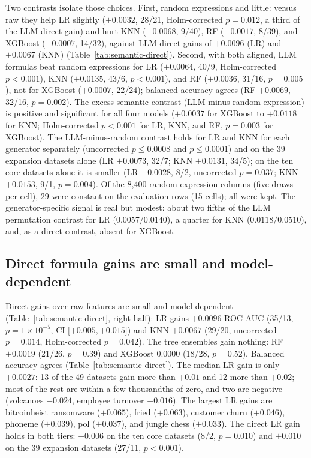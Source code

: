Two contrasts isolate those choices. First, random expressions add little: versus raw they help LR slightly (\(+0.0032\), 28/21, Holm-corrected \(p = 0.012\), a third of the LLM direct gain) and hurt KNN (\(-0.0068\), 9/40), RF (\(-0.0017\), 8/39), and XGBoost (\(-0.0007\), 14/32), against LLM direct gains of \(+0.0096\) (LR) and \(+0.0067\) (KNN) (Table~\ref{tab:semantic-direct}). Second, with both aligned, LLM formulas beat random expressions for LR (\(+0.0064\), 40/9, Holm-corrected \(p < 0.001\)), KNN (\(+0.0135\), 43/6, \(p < 0.001\)), and RF (\(+0.0036\), 31/16, \(p = 0.005\)), not for XGBoost (\(+0.0007\), 22/24); balanced accuracy agrees (RF \(+0.0069\), 32/16, \(p = 0.002\)). The excess semantic contrast (LLM minus random-expression) is positive and significant for all four models (\(+0.0037\) for XGBoost to \(+0.0118\) for KNN; Holm-corrected \(p < 0.001\) for LR, KNN, and RF, \(p = 0.003\) for XGBoost). The LLM-minus-random contrast holds for LR and KNN for each generator separately (uncorrected \(p \le 0.0008\) and \(p \le 0.0001\)) and on the 39 expansion datasets alone (LR \(+0.0073\), 32/7; KNN \(+0.0131\), 34/5); on the ten core datasets alone it is smaller (LR \(+0.0028\), 8/2, uncorrected \(p = 0.037\); KNN \(+0.0153\), 9/1, \(p = 0.004\)). Of the 8{,}400 random expression columns (five draws per cell), 29 were constant on the evaluation rows (15 cells); all were kept. The generator-specific signal is real but modest: about two fifths of the LLM permutation contrast for LR (\(0.0057/0.0140\)), a quarter for KNN (\(0.0118/0.0510\)), and, as a direct contrast, absent for XGBoost.




\subsection{Direct formula gains are small and model-dependent}\label{sec:direct}

Direct gains over raw features are small and model-dependent (Table~\ref{tab:semantic-direct}, right half): LR gains \(+0.0096\) ROC-AUC (35/13, \(p = 1 \times 10^{-5}\), CI \(\lbrack +0.005, +0.015\rbrack\)) and KNN \(+0.0067\) (29/20, uncorrected \(p = 0.014\), Holm-corrected \(p = 0.042\)). The tree ensembles gain nothing: RF \(+0.0019\) (21/26, \(p = 0.39\)) and XGBoost \(0.0000\) (18/28, \(p = 0.52\)). Balanced accuracy agrees (Table~\ref{tab:semantic-direct}). The median LR gain is only \(+0.0027\): 13 of the 49 datasets gain more than \(+0.01\) and 12 more than \(+0.02\); most of the rest are within a few thousandths of zero, and two are negative (volcanoes \(-0.024\), employee turnover \(-0.016\)). The largest LR gains are bitcoinheist ransomware (\(+0.065\)), fried (\(+0.063\)), customer churn (\(+0.046\)), phoneme (\(+0.039\)), pol (\(+0.037\)), and jungle chess (\(+0.033\)). The direct LR gain holds in both tiers: \(+0.006\) on the ten core datasets (8/2, \(p = 0.010\)) and \(+0.010\) on the 39 expansion datasets (27/11, \(p < 0.001\)).

